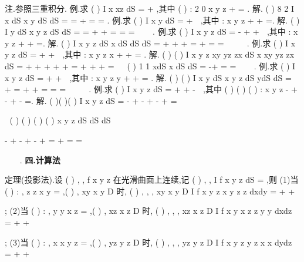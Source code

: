 \textcolor{lyred}{注}.参照三重积分.\textcolor{lyred}{ }
\textcolor{lyred}{例}.求
(
)
I
x
xz dS
\Sigma 
=
+
\int \int 
,其中
(
)
:
2 0
x
y
z
\Sigma 
+
=
\le 
\le 
. 
解.
(
)
8 2
I
x dS
x
y
dS
dS
\pi 
\Sigma 
\Sigma 
\Sigma 
=
=
+
=
=
\int \int 
\int \int 
\int \int 
. 
\textcolor{lyred}{例}.求
(
)
I
x
y dS
\Sigma 
=
+
\int \int 
,其中
:
x
y
z
\Sigma 
+
+
=. 
解.
(
)
I
y dS
x
y
z dS
dS
\Sigma 
\Sigma 
\Sigma 
=
=
+
+
=
=
\cdots \cdots 
=
\int \int 
\int \int 
\int \int 



. 
\textcolor{lyred}{例}.求
(
)
I
x
y
z
dS
\Sigma 
=
-
+
+
\int \int 
,其中
:
x
y
z
\Sigma 
+
+
=. 
解.
(
)
I
x
y
z
dS
x dS
dS
dS
\pi 
\Sigma 
\Sigma 
\Sigma 
\Sigma 
=
+
+
+
=
+
=
=
\int \int 
\int \int 
\int \int 
\int \int 




. 
\textcolor{lyred}{例}.求
(
)
I
x
y
z
dS
\Sigma 
=
+
+
\int \int 
,其中
:
x
y
z
x
\Sigma 
+
+
=
. 
解.
(
)
(
)
I
x
y
z
xy
yz
zx dS
x
xy
yz
zx dS
\Sigma 
\Sigma 
=
+
+
+
+
+
=
+
+
+
=
\int \int 
\int \int 


(
)
1 1
xdS
x
dS
dS
\pi 
\Sigma 
\Sigma 
\Sigma 
=
-+
=
=
\int \int 
\int \int 
\int \int 



. 
\textcolor{lyred}{例}.求
(
)
I
x
y
z
dS
\Sigma 
=
+
+
\int \int 
,其中
:
x
y
z
y
\Sigma 
+
+
=
. 
解.
(
)
(
)
I
x
y
dS
x
y
z
dS
ydS
dS
\pi 
\Sigma 
\Sigma 
\Sigma 
\Sigma 
=
+
=
+
+
=
=
=
\int \int 
\int \int 
\int \int 
\int \int 




. 
\textcolor{lyred}{例}.求
(
)
I
x
y
z
dS
\Sigma 
=
+
+
-
\int \int 
,其中
(
)
(
)
(
)
:
x
y
z
\Sigma 
-
+
-
+
-
=. 
解.
(
)(
)(
)
I
x
y
z
dS
\Sigma 
=
-
+
-
+
-
+
=




\int \int 
(
)
(
)
(
)
(
)
x
y
z
dS
dS
dS
\pi 
\Sigma 
\Sigma 
\Sigma 


-
+
-
+
-
+
=
+
=
=


\int \int 
\int \int 
\int \int 



. 
\vspace{4pt}
{\bfseries \textcolor{lyred}{四.计算法}}

\textcolor{lyred}{定理(投影法)}.设
(
)
, ,
f x y z 在光滑曲面\Sigma 上连续,记
(
)
, ,
I
f x y z dS
\Sigma 
=\int \int 
,则 
(1)当
(
)
:
,
z
z x y
\Sigma 
=
,(
)
,
xy
x y
D
\in 
时,
(
)
, ,
,
xy
x
y
D
I
f
x y z x y
z
z dxdy
=
+
+




\int \int 
; 
(2)当
(
)
:
,
y
y x z
\Sigma 
=
,(
)
,
xz
x z
D
\in 
时,
(
)
,
,
,
xz
x
z
D
I
f
x y x z
z
y
y dxdz
=
+
+




\int \int 
; 
(3)当
(
)
:
,
x
x y z
\Sigma 
=
,(
)
,
yz
y z
D
\in 
时,
(
)
,
, ,
yz
y
z
D
I
f
x y z
y z
x
x dydz
=
+
+




